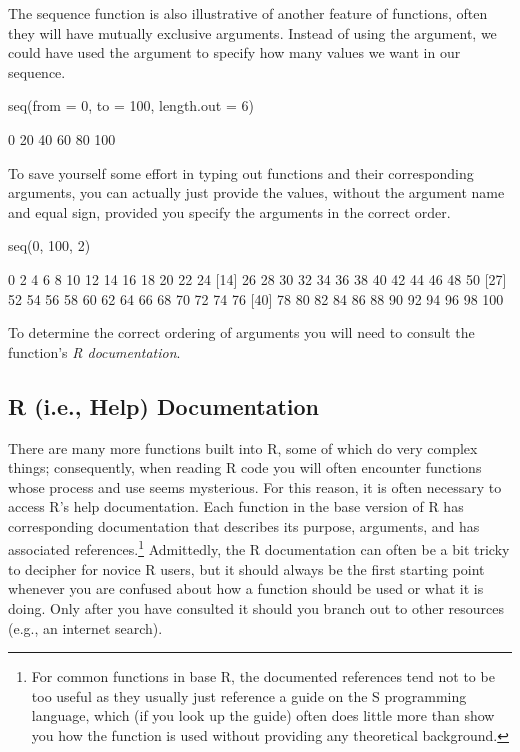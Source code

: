 The sequence function is also illustrative of another feature of functions, often they will have mutually exclusive arguments. Instead of using the  argument, we could have used the  argument to specify how many values we want in our sequence.

\begin{inR}
seq(from = 0, to = 100, length.out = 6)
\end{inR}
\begin{outR}
[1]   0  20  40  60  80 100
\end{outR}

To save yourself some effort in typing out functions and their corresponding arguments, you can actually just provide the values, without the argument name and equal sign, provided you specify the arguments in the correct order.

\begin{inR}
seq(0, 100, 2)
\end{inR}
\begin{outR}
 [1]   0   2   4   6   8  10  12  14  16  18  20  22  24
[14]  26  28  30  32  34  36  38  40  42  44  46  48  50
[27]  52  54  56  58  60  62  64  66  68  70  72  74  76
[40]  78  80  82  84  86  88  90  92  94  96  98 100
\end{outR}

\noindent
To determine the correct ordering of arguments you will need to consult the function's \textit{R documentation}.

\subsection{R (i.e., Help) Documentation}

There are many more functions built into R, some of which do very complex things; consequently, when reading R code you will often encounter functions whose process and use seems mysterious.  For this reason, it is often necessary to access R's help documentation. Each function in the base version of R has corresponding documentation that describes its purpose, arguments, and has associated references.\footnote{For common functions in base R, the documented references tend not to be too useful as they usually just reference a guide on the S programming language, which (if you look up the guide) often does little more than show you how the function is used without providing any theoretical background.} Admittedly, the R documentation can often be a bit tricky to decipher for novice R users, but it should always be the first starting point whenever you are confused about how a function should be used or what it is doing.  Only after you have consulted it should you branch out to other resources (e.g., an internet search).

